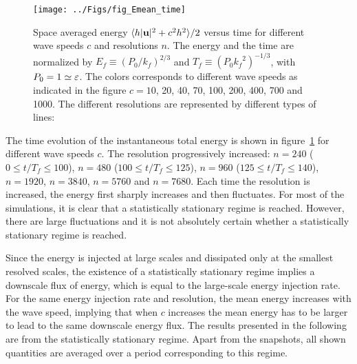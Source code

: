 \begin{figure}
\centerline{\texttt{[image: ../Figs/fig\_Emean\_time]}}
\caption{Space averaged energy 
$\langle h|\textbf{u}|^2 + c^2 h^2 \rangle/2$ versus time 
for different wave speeds $c$ and resolutions $n$.
%
The energy and the time are normalized by 
$E_f\equiv (P_0/k_f)^{2/3}$ and $T_f\equiv (P_0 {k_f}^2)^{-1/3}$,
with $P_0 = 1 \simeq \varepsilon$.
%
The colors corresponds to different wave speeds as indicated in the figure
$c= 10$, 20, 40, 70, 100, 200, 400, 700 and 1000.
%
The different resolutions are represented by different types of lines:
}
\label{fig_Evstime}
\end{figure}






The time evolution of the instantaneous total energy is shown in
figure~\ref{fig_Evstime} for different wave speeds $c$.
%
The resolution  progressively
increased: %
$n = 240$ ($0\leqslant t/T_f \leqslant 100$), %
$n = 480$ ($100\leqslant t/T_f \leqslant 125$), %
$n = 960$ ($125\leqslant t/T_f \leqslant 140$), %
$n = 1920$, %
$n = 3840$, %
$n = 5760$ and %
$n = 7680$.
%
Each time the resolution is increased, the energy first sharply
increases and then fluctuates.  For most of the simulations, it is
clear that a statistically stationary regime is reached.
%
However, 
%
%
%
there are large fluctuations and it is not absolutely certain whether
a statistically stationary regime is reached.
%
%


Since the energy is injected at large scales and dissipated only at
the smallest resolved scales, the existence of a statistically
stationary regime implies a downscale flux of energy, which is equal
to the large-scale energy injection rate.
%
For the same energy injection rate and resolution, the mean energy
increases with the wave speed, implying that when $c$ increases the
mean energy has to be larger to lead to the same downscale energy
flux.
%
The results presented in the following are from the statistically
stationary regime.  Apart from the snapshots, all shown quantities are
averaged over a period corresponding to this regime.



